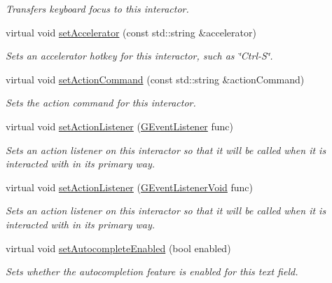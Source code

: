 \begin{DoxyCompactItemize}
\begin{DoxyCompactList}\small\item\em Transfers keyboard focus to this interactor. \end{DoxyCompactList}\item 
virtual void \mbox{\hyperlink{classsgl_1_1GInteractor_ad15f102f62e2960576012f1aa0ba4b2e}{set\+Accelerator}} (const std\+::string \&accelerator)
\begin{DoxyCompactList}\small\item\em Sets an accelerator hotkey for this interactor, such as \char`\"{}\+Ctrl-\/\+S\char`\"{}. \end{DoxyCompactList}\item 
virtual void \mbox{\hyperlink{classsgl_1_1GInteractor_a4b5843fe3030e038a1ba54cc03389bcf}{set\+Action\+Command}} (const std\+::string \&action\+Command)
\begin{DoxyCompactList}\small\item\em Sets the action command for this interactor. \end{DoxyCompactList}\item 
virtual void \mbox{\hyperlink{classsgl_1_1GInteractor_adcfb4742430c88714fcf57e57ab8ea9c}{set\+Action\+Listener}} (\mbox{\hyperlink{namespacesgl_ae9f3e9eab70035da1a2b114e21357b25}{G\+Event\+Listener}} func)
\begin{DoxyCompactList}\small\item\em Sets an action listener on this interactor so that it will be called when it is interacted with in its primary way. \end{DoxyCompactList}\item 
virtual void \mbox{\hyperlink{classsgl_1_1GInteractor_aebd20a89c7a8a43a6fce999cf4f9fcf2}{set\+Action\+Listener}} (\mbox{\hyperlink{namespacesgl_a54427ce97bb1c2804e4fe2b0a62e8b17}{G\+Event\+Listener\+Void}} func)
\begin{DoxyCompactList}\small\item\em Sets an action listener on this interactor so that it will be called when it is interacted with in its primary way. \end{DoxyCompactList}\item 
virtual void \mbox{\hyperlink{classsgl_1_1GTextField_a173f724f6099be5a2ed423baf3433b83}{set\+Autocomplete\+Enabled}} (bool enabled)
\begin{DoxyCompactList}\small\item\em Sets whether the autocompletion feature is enabled for this text field. \end{DoxyCompactList}\item 

\end{DoxyCompactItemize}

